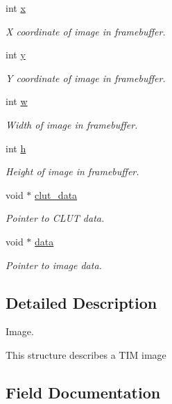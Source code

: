 \begin{DoxyCompactItemize}
int \hyperlink{structGsImage_a7f481bb2d04e6d2fcab28a70740a087b}{x}
\begin{DoxyCompactList}\small\item\em X coordinate of image in framebuffer. \end{DoxyCompactList}\item 
int \hyperlink{structGsImage_abe372808a69fc03db2f832375a28f421}{y}
\begin{DoxyCompactList}\small\item\em Y coordinate of image in framebuffer. \end{DoxyCompactList}\item 
int \hyperlink{structGsImage_a9161db2be29ff2caf39a9b8fea7256fc}{w}
\begin{DoxyCompactList}\small\item\em Width of image in framebuffer. \end{DoxyCompactList}\item 
int \hyperlink{structGsImage_a833613285c334d6e02dab93a6851ea9e}{h}
\begin{DoxyCompactList}\small\item\em Height of image in framebuffer. \end{DoxyCompactList}\item 
void $\ast$ \hyperlink{structGsImage_a70b2875be1afa7d9b815004c1eea263f}{clut\+\_\+data}
\begin{DoxyCompactList}\small\item\em Pointer to C\+L\+U\+T data. \end{DoxyCompactList}\item 
void $\ast$ \hyperlink{structGsImage_a911f9bc144bfeb7a1f7a4a761f8107c0}{data}
\begin{DoxyCompactList}\small\item\em Pointer to image data. \end{DoxyCompactList}\end{DoxyCompactItemize}


\subsection{Detailed Description}
Image. 

This structure describes a T\+I\+M image 

\subsection{Field Documentation}
\hypertarget{structGsImage_a70b2875be1afa7d9b815004c1eea263f}{}

